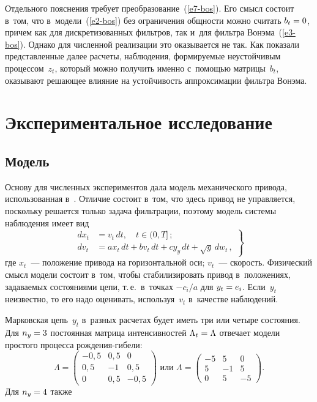 \begin{multicols}{2}
{}
     
     Отдельного пояснения требует преобразование~(\ref{e7-bos}). Его смысл со\-сто\-ит 
в~том, что в~модели~(\ref{e2-bos}) без ограничения общ\-ности можно считать 
$b_t\hm=0$, причем как для дискретизованных фильт\-ров, так и~для фильт\-ра 
Вонэма~(\ref{e3-bos}). Однако для чис\-лен\-ной реализации это оказывается не так. Как 
показали пред\-став\-лен\-ные далее рас\-че\-ты, наблюдения, фор\-ми\-ру\-емые 
неустойчивым процессом~$z_t$, который мож\-но получить именно 
с~по\-мощью мат\-ри\-цы~$b_t$, оказывают ре\-ша\-ющее влияние на устой\-чи\-вость 
аппроксимации фильт\-ра Вонэма.
     
\section{Экспериментальное исследование}

\subsection{Модель}

     Основу для численных экспериментов дала модель механического 
привода, использованная в~\cite{19-bos}. Отличие со\-сто\-ит в~том, что здесь 
привод не управ\-ля\-ет\-ся, поскольку решается только задача фильт\-ра\-ции, 
поэтому модель сис\-те\-мы наблюдения имеет вид
     \begin{equation}
     \left.
     \begin{array}{rl}
     dx_t&=v_t\,dt,\quad t\in (0,T]\,;\\[3pt]
      dv_t &=ax_t \,dt +bv_t \,dt+ cy_y \,dt+ \sqrt{g}\,dw_t\,,
      \end{array}
      \right\}
     \label{e9-bos}
     \end{equation}
где $x_t$~--- положение привода на горизонтальной оси; $v_t$~---  
ско\-рость. Физический смысл модели со\-сто\-ит в~том, чтобы стабилизировать 
привод в~положениях, за\-да\-ва\-емых со\-сто\-яни\-ями цепи, т.\,е.\ в~точках $-c_i/a$ 
для $y_t\hm= e_i$. Если~$y_t$ неизвестно, то его надо оценивать, 
используя~$v_t$ в~качестве наблюдений.
      
      Марковская цепь~$y_t$ в~разных расчетах будет иметь три или четыре 
со\-сто\-яния. Для $n_y\hm=3$ по\-сто\-ян\-ная мат\-ри\-ца интенсивностей 
$\Lambda_t\hm=\Lambda$ отвечает модели прос\-то\-го процесса  
рож\-де\-ния-ги\-бе\-ли: 
$$
\Lambda = 
      \begin{pmatrix}
       -0{,}5 & 0{,}5 & 0\\
      0{,}5 & -1 & 0{,}5\\
      0& 0{,}5 & -0{,}5
      \end{pmatrix} 
      \mbox{\ \ или\ \ } 
      \Lambda= 
      \begin{pmatrix}
      -5 & 5 &0\\
      5 &-1& 5\\
      0&5&-5
      \end{pmatrix}.
      $$
       Для $n_y\hm=4$ также 
       

\end{multicols}
